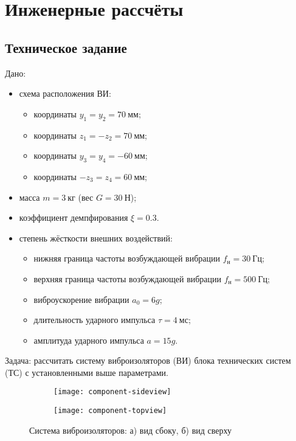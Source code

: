 \chapter{Инженерные рассчёты}

\section{Техническое задание}

Дано:
\begin{itemize}
    \item схема расположения ВИ:
        \begin{itemize}
            \item координаты $y_1  = y_2  = 70~мм$;
            \item координаты $z_1  = -z_2 = 70~мм$;
            \item координаты $y_3  = y_4  = -60~мм$;
            \item координаты $-z_3 = z_4  = 60~мм$;
        \end{itemize}
    \item масса $m = 3~кг$ (вес $G = 30~Н$);
    \item коэффициент демпфирования $\xi = 0.3$.
    \item степень жёсткости внешних воздействий:
        \begin{itemize}
            \item нижняя граница частоты возбуждающей вибрации $f_н = 30~Гц$;
            \item верхняя граница частоты возбуждающей вибрации $f_н = 500~Гц$;
            \item виброускорение вибрации $a_0 = 6g$;
            \item длительность ударного импульса $\tau = 4~мс$;
            \item амплитуда ударного импульса $a = 15g$.
        \end{itemize}
\end{itemize}

Задача: рассчитать систему виброизоляторов (ВИ) блока технических систем (ТС) с установленными выше параметрами.

\begin{figure}[!h]
    \centering
    \begin{subfigure}[t]{0.5\textwidth}
        \centering
        \texttt{[image: component-sideview]}
        \caption{}
    \end{subfigure}

    \begin{subfigure}[t]{0.5\textwidth}
        \centering
        \texttt{[image: component-topview]}
        \caption{}
    \end{subfigure}
    \caption{Система виброизоляторов: а) вид сбоку, б) вид сверху}
\end{figure}


